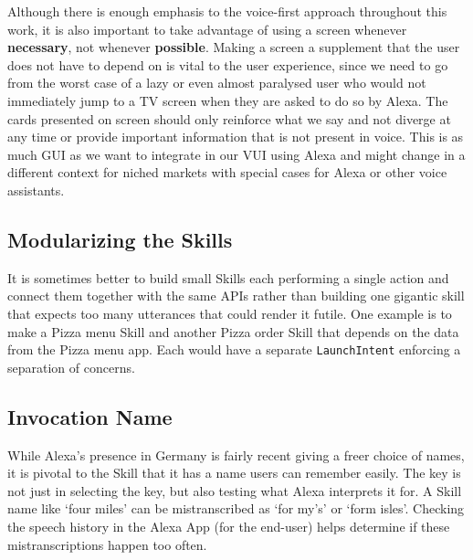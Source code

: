 Although there is enough emphasis to the voice-first approach throughout this work, it is also important to take advantage of using a screen whenever \textbf{necessary}, not whenever \textbf{possible}. Making a screen a supplement that the user does not have to depend on is vital to the user experience, since we need to go from the worst case of a lazy or even almost paralysed user who would not immediately jump to a TV screen when they are asked to do so by Alexa. The cards presented on screen should only reinforce what we say and not diverge at any time or provide important information that is not present in voice. This is as much GUI as we want to integrate in our VUI using Alexa and might change in a different context for niched markets with special cases for Alexa or other voice assistants.


\subsection*{Modularizing the Skills}
It is sometimes better to build small Skills each performing a single action and connect them together with the same APIs rather than building one gigantic skill that expects too many utterances that could render it futile. One example is to make a Pizza menu Skill and another Pizza order Skill that depends on the data from the Pizza menu app. Each would have a separate \texttt{LaunchIntent} enforcing a separation of concerns.


\subsection*{Invocation Name}

While Alexa's presence in Germany is fairly recent giving a freer choice of names, it is pivotal to the Skill that it has a name users can remember easily. The key is not just in selecting the key, but also testing what Alexa interprets it for. A Skill name like `four miles' can be mistranscribed as `for my's' or `form isles'. Checking the speech history in the Alexa App (for the end-user) helps determine if these mistranscriptions happen too often.


